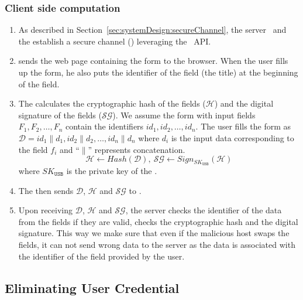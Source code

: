 \subsubsection{Client side computation}

\begin{enumerate}
  \item As described in Section~\ref{sec:systemDesign:secureChannel}, the server \server\ and the \device establish a secure channel (\tls) leveraging the \webusb\ API.
 
  \item \server sends the web page containing the form to the browser. When the user fills up the form, he also puts the identifier of the field (the title) at the beginning of the field.
  
  \item The \device calculates the cryptographic hash of the fields ($\mathcal{H}$) and the digital signature of the fields ($\mathcal{SG}$).
  We assume the form with input fields $F_1, F_2, \ldots, F_n$ contain the identifiers $id_1, id_2, \ldots, id_n$. The user fills the form as $\mathcal{D} = id_1\|d_1, id_2\|d_2, \ldots, id_n\|d_n$ where $d_i$ is the input data corresponding to the field $f_i$ and ``$\|$'' represents \String concatenation.
  $$\mathcal{H} \leftarrow Hash(\mathcal{D}),\ \mathcal{SG} \leftarrow Sign_{{SK}_\texttt{USB}}(\mathcal{H})$$ 
  where $SK_\texttt{USB}$ is the private key of the \device.
  \item The \device then sends $\mathcal{D}$, $\mathcal{H}$ and $\mathcal{SG}$ to \server.
  
  \item Upon receiving $\mathcal{D}$, $\mathcal{H}$ and $\mathcal{SG}$, the server checks the identifier of the data from the fields if they are valid, checks the cryptographic hash and the digital signature. This way we make sure that even if the malicious host swaps the fields, it can not send wrong data to the server as the data is associated with the identifier of the field provided by the user.

\end{enumerate}



\ifpaper

\subsection{Eliminating User Credential}
\label{sec:systemDesign::passwordManager}

